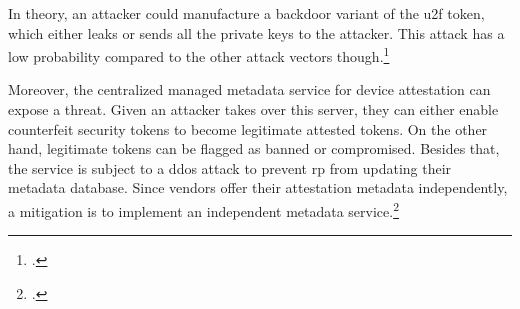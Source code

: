 In theory, an attacker could manufacture a backdoor variant of the \gls{u2f} token, which either leaks or sends all the private keys to the attacker. This attack has a low probability compared to the other attack vectors though.\footcites[See][3]{DBLP:journals/corr/abs-1810-04660}

Moreover, the centralized managed metadata service for device attestation can expose a threat. Given an attacker takes over this server, they can either enable counterfeit security tokens to become legitimate attested tokens. On the other hand, legitimate tokens can be flagged as banned or compromised. Besides that, the service is subject to a \gls{ddos} attack to prevent \gls{rp} from updating their metadata database. Since vendors offer their attestation metadata independently, a mitigation is to implement an independent metadata service.\footcites[See][]{fido-metadata}